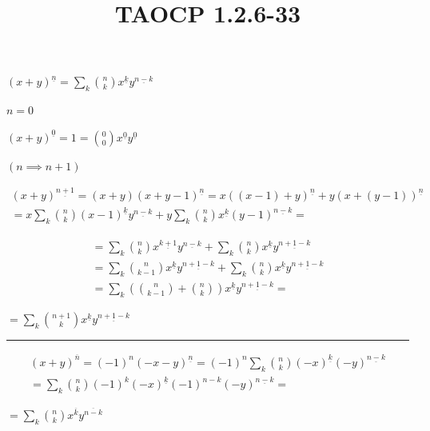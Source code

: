 \documentclass{article}
\title{TAOCP 1.2.6\mbox{-}33}
\begin{document}
\maketitle

\( {(x+y)}^{\underline{n}} = \sum_{k} \binom{n}{k} x^{\underline{k}}y^{\underline{n-k}} \)

\( n = 0 \)

\( {(x+y)}^{\underline{0}} = 1 = \binom{0}{0} x^{\underline{0}}y^{\underline{0}} \)

\( (n \implies n + 1) \)

\begin{multline*}
{(x+y)}^{\underline{n+1}} = (x+y){(x+y-1)}^{\underline{n}} = x{((x-1)+y)}^{\underline{n}} + y{(x+(y-1))}^{\underline{n}} \\
= x \sum_{k} \binom{n}{k} {(x-1)}^{\underline{k}}y^{\underline{n-k}} + y \sum_{k} \binom{n}{k} x^{\underline{k}}{(y-1)}^{\underline{n-k}} =
\end{multline*}

\begin{multline*}
= \sum_{k} \binom{n}{k} x^{\underline{k+1}}y^{\underline{n-k}} + \sum_{k} \binom{n}{k} x^{\underline{k}}y^{\underline{n+1-k}} \\
= \sum_{k} \binom{n}{k-1} x^{\underline{k}}y^{\underline{n+1-k}} + \sum_{k} \binom{n}{k} x^{\underline{k}}y^{\underline{n+1-k}} \\
= \sum_{k} (\binom{n}{k-1} + \binom{n}{k})x^{\underline{k}}y^{\underline{n+1-k}} =
\end{multline*}

\( = \sum_{k} \binom{n+1}{k}x^{\underline{k}}y^{\underline{n+1-k}} \)

\bigskip\hrule\bigskip

\begin{multline*}
{(x+y)}^{\overline{n}} = {(-1)}^{n} {(-x-y)}^{\underline{n}} = {(-1)}^{n} \sum_{k} \binom{n}{k} {(-x)}^{\underline{k}}{(-y)}^{\underline{n-k}} \\
= \sum_{k} \binom{n}{k} {(-1)}^{k}{(-x)}^{\underline{k}}{(-1)}^{n-k}{(-y)}^{\underline{n-k}} =
\end{multline*}

\( = \sum_{k} \binom{n}{k}x^{\overline{k}}y^{\overline{n-k}} \)
\end{document}
